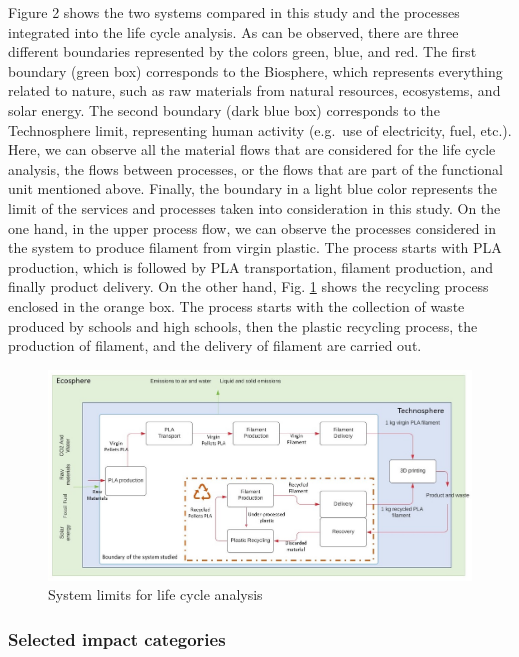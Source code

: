 \documentclass[12pt]{elsarticle} %
\begin{document}
Figure 2 shows the two systems compared in this study and the processes integrated into the life cycle analysis.
As can be observed, there are three different boundaries represented by the colors green, blue, and red.
The first boundary (green box) corresponds to the Biosphere, which represents everything related to nature, such as raw materials from natural resources, ecosystems, and solar energy.
The second boundary (dark blue box) corresponds to the Technosphere limit, representing human activity (e.g.~use of electricity, fuel, etc.).
Here, we can observe all the material flows that are considered for the life cycle analysis, the flows between processes, or the flows that are part of the functional unit mentioned above.
Finally, the boundary in a light blue color represents the limit of the services and processes taken into consideration in this study. On the one hand, in the upper process flow, we can observe the processes considered in the system to produce filament from virgin plastic.
The process starts with PLA production, which is followed by PLA transportation, filament production, and finally product delivery.
On the other hand, Fig. \ref{fig:figure1} shows the recycling process enclosed in the orange box.
The process starts with the collection of waste produced by schools and high schools, then the plastic recycling process, the production of filament, and the delivery of filament are carried out.

\begin{figure}[H]

{\centering \includegraphics[width=1\linewidth,]{Figures/Figure-1} 

}

\caption{System limits for life cycle analysis}\label{fig:figure1}
\end{figure}

\hypertarget{impactcat}{%
\subsubsection{Selected impact categories}\label{impactcat}}
\end{document}
